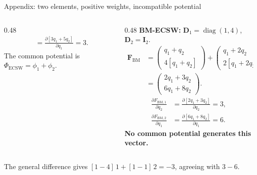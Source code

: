 \documentclass[aspectratio=169]{beamer}
\newcommand{\vect}[1]{\boldsymbol{#1}}
\newcommand{\matr}[1]{\boldsymbol{#1}}
\begin{document}
\begin{frame}{Appendix: two elements, positive weights, incompatible potential}
\begin{columns}[T,onlytextwidth]
\begin{column}{0.48\textwidth}
\[\begin{aligned}
  &=\frac{\partial[3q_1+5q_2]}{\partial q_1}=3.
\end{aligned}
\]
The common potential is $\Phi_{\mathrm{ECSW}}=\phi_1+\phi_2$.
\end{column}
\begin{column}{0.48\textwidth}
\textbf{BM-ECSW:} $\matr{D}_1=\operatorname{diag}(1,4)$, $\matr{D}_2=\matr{I}_2$.
\[
\begin{aligned}
  \vect{F}_{\mathrm{BM}}
  &=\begin{pmatrix}q_1+q_2\\4[q_1+q_2]\end{pmatrix}
    +\begin{pmatrix}q_1+2q_2\\2[q_1+2q_2]\end{pmatrix}\\
  &=\begin{pmatrix}2q_1+3q_2\\6q_1+8q_2\end{pmatrix}.
\end{aligned}
\]
\[
\begin{aligned}
  \frac{\partial F_{\mathrm{BM},1}}{\partial q_2}
  &=\frac{\partial[2q_1+3q_2]}{\partial q_2}=3,\\
  \frac{\partial F_{\mathrm{BM},2}}{\partial q_1}
  &=\frac{\partial[6q_1+8q_2]}{\partial q_1}=6.
\end{aligned}
\]
\textbf{No common potential generates this vector.}
\end{column}
\end{columns}
The general difference gives $[1-4]\,1+[1-1]\,2=-3$, agreeing with $3-6$.
\vfill
\hfill\hyperlink{bmecsw-structural-stability}{}
\quad\hyperlink{bmecsw-mechanical-structure}{}
\end{frame}
\end{document}
